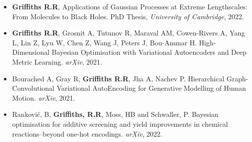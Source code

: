 \documentclass[11pt]{article}
\begin{document}


\begin{itemize}

\item \textbf{Griffiths R.R}, Applications of Gaussian Processes at Extreme Lengthscales: From Molecules to Black Holes. PhD Thesis, \textit{University of Cambridge}, 2022.

\end{itemize}
 


\begin{itemize}

\item \textbf{Griffiths R.R}, Grosnit A, Tutunov R, Maraval AM, Cowen-Rivers A, Yang L, Lin Z, Lyu W, Chen Z, Wang J, Peters J, Bou-Ammar H. High-Dimensional Bayesian Optimisation with Variational Autoencoders and Deep Metric Learning. \textit{arXiv}, 2021.

\end{itemize}
 


\begin{itemize}

\item Bourached A, Gray R, \textbf{Griffiths R.R}, Jha A, Nachev P. Hierarchical Graph-Convolutional Variational AutoEncoding for Generative Modelling of Human Motion. \textit{arXiv}, 2021.

\end{itemize}
 


\begin{itemize}

\item Ranković, B, \textbf{Griffiths, R.R}, Moss, HB and Schwaller, P. Bayesian optimisation for additive screening and yield improvements in chemical reactions–beyond one-hot encodings. \textit{arXiv}, 2022.

\end{itemize}
 
\end{document}
